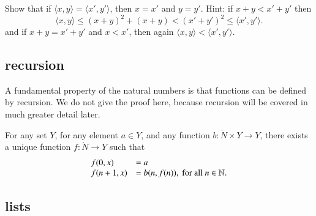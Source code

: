 \begin{exer} Show that if $\langle x,y\rangle = \langle x',y'\rangle$, then $x=x'$ and $y=y'$.
Hint: if $x+y < x'+y'$ then 
$$
\langle x,y\rangle\le (x+y)^2+(x+y) < (x'+y')^2 \le \langle x',y'\rangle.
$$
and if $x+y=x'+y'$ and $x<x'$, then again $\langle x,y\rangle < \langle x',y'\rangle$.
\end{exer}



\subsection{recursion}

A fundamental property of the natural numbers is that functions can be
defined by recursion.  We do not give the proof here, because recursion will be covered in much greater detail later.




\begin{assert}[recursion]  For any set $Y$, for any element $a\in Y$, and any function $b:\ring{N}\times Y\to Y$, there exists a unique function $f:\ring{N}\to Y$ such that
$$
\begin{array}{lll}
f(0,x) &= a\\
f(n+1,x) &= b(n,f(n)),\hbox{ for all } n\in\mathbb{N}.
\end{array}
$$
\end{assert}



\subsection{lists}

